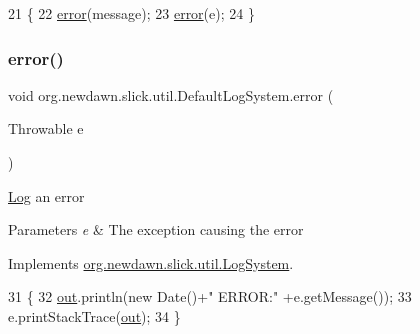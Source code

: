 \begin{DoxyCode}
21                                                    \{
22         \mbox{\hyperlink{classorg_1_1newdawn_1_1slick_1_1util_1_1_default_log_system_a4ba3a42657c5f7ee2c55fa49dbe7a287}{error}}(message);
23         \mbox{\hyperlink{classorg_1_1newdawn_1_1slick_1_1util_1_1_default_log_system_a4ba3a42657c5f7ee2c55fa49dbe7a287}{error}}(e);
24     \}
\end{DoxyCode}
\mbox{\label{classorg_1_1newdawn_1_1slick_1_1util_1_1_default_log_system_a631253b42ce86ee0cbfdfc2df26008e8}} 
\subsubsection{\texorpdfstring{error()}{error()}\hspace{0.1cm}{\footnotesize\ttfamily [2/3]}}
{\footnotesize\ttfamily void org.\+newdawn.\+slick.\+util.\+Default\+Log\+System.\+error (\begin{DoxyParamCaption}\item[{Throwable}]{e }\end{DoxyParamCaption})\hspace{0.3cm}{\ttfamily [inline]}}

\mbox{\hyperlink{classorg_1_1newdawn_1_1slick_1_1util_1_1_log}{Log}} an error


\begin{DoxyParams}{Parameters}
{\em e} & The exception causing the error \\
\hline
\end{DoxyParams}


Implements \mbox{\hyperlink{interfaceorg_1_1newdawn_1_1slick_1_1util_1_1_log_system_a0aa3df31981dca33a62896d4f4dbda7b}{org.\+newdawn.\+slick.\+util.\+Log\+System}}.


\begin{DoxyCode}
31                                    \{
32         \mbox{\hyperlink{classorg_1_1newdawn_1_1slick_1_1util_1_1_default_log_system_af8720c665caabb6455863d23de8617da}{out}}.println(\textcolor{keyword}{new} Date()+\textcolor{stringliteral}{" ERROR:"} +e.getMessage());
33         e.printStackTrace(\mbox{\hyperlink{classorg_1_1newdawn_1_1slick_1_1util_1_1_default_log_system_af8720c665caabb6455863d23de8617da}{out}});
34     \}
\end{DoxyCode}
\mbox{\label{classorg_1_1newdawn_1_1slick_1_1util_1_1_default_log_system_ae28cce21f2c8a9aacd97f571fcb1b3c2}} 
